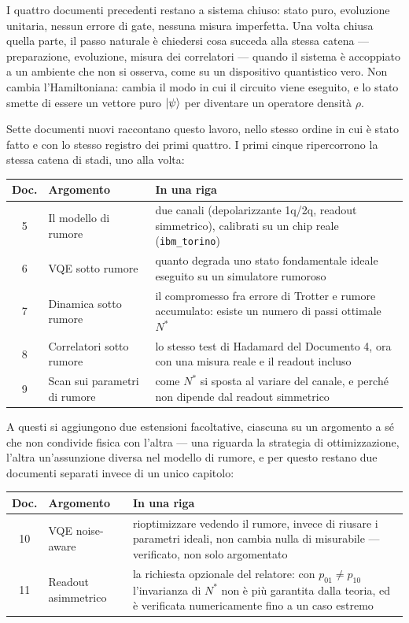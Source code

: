 \documentclass[11pt,a4paper]{article}
\begin{document}
I quattro documenti precedenti restano a sistema chiuso: stato puro, evoluzione
unitaria, nessun errore di gate, nessuna misura imperfetta. Una volta chiusa
quella parte, il passo naturale è chiedersi cosa succeda alla stessa catena ---
preparazione, evoluzione, misura dei correlatori --- quando il sistema è
accoppiato a un ambiente che non si osserva, come su un dispositivo quantistico
vero. Non cambia l'Hamiltoniana: cambia il modo in cui il circuito viene
eseguito, e lo stato smette di essere un vettore puro $\lvert \psi\rangle$ per diventare
un operatore densità $\rho$.

Sette documenti nuovi raccontano questo lavoro, nello stesso ordine in cui è
stato fatto e con lo stesso registro dei primi quattro. I primi cinque
ripercorrono la stessa catena di stadi, uno alla volta:

\begin{center}
\small
\renewcommand{\arraystretch}{1.3}
\begin{tabular}{@{}clp{7.6cm}@{}}
\toprule
\textbf{Doc.} & \textbf{Argomento} & \textbf{In una riga} \\
\midrule
5 & Il modello di rumore & due canali (depolarizzante 1q/2q, readout
   simmetrico), calibrati su un chip reale (\texttt{ibm\_torino}) \\
6 & VQE sotto rumore & quanto degrada uno stato fondamentale ideale eseguito
   su un simulatore rumoroso \\
7 & Dinamica sotto rumore & il compromesso fra errore di Trotter e rumore
   accumulato: esiste un numero di passi ottimale $N^*$ \\
8 & Correlatori sotto rumore & lo stesso test di Hadamard del Documento 4,
   ora con una misura reale e il readout incluso \\
9 & Scan sui parametri di rumore & come $N^*$ si sposta al variare del
   canale, e perché non dipende dal readout simmetrico \\
\bottomrule
\end{tabular}
\end{center}

A questi si aggiungono due estensioni facoltative, ciascuna su un argomento a
sé che non condivide fisica con l'altra --- una riguarda la strategia di
ottimizzazione, l'altra un'assunzione diversa nel modello di rumore, e per
questo restano due documenti separati invece di un unico capitolo:

\begin{center}
\small
\renewcommand{\arraystretch}{1.3}
\begin{tabular}{@{}clp{7.6cm}@{}}
\toprule
\textbf{Doc.} & \textbf{Argomento} & \textbf{In una riga} \\
\midrule
10 & VQE noise-aware & rioptimizzare vedendo il rumore, invece di riusare i
   parametri ideali, non cambia nulla di misurabile --- verificato, non solo
   argomentato \\
11 & Readout asimmetrico & la richiesta opzionale del relatore: con
   $p_{01}\neq p_{10}$ l'invarianza di $N^*$ non è più garantita dalla teoria,
   ed è verificata numericamente fino a un caso estremo \\
\bottomrule
\end{tabular}
\end{center}
\end{document}
